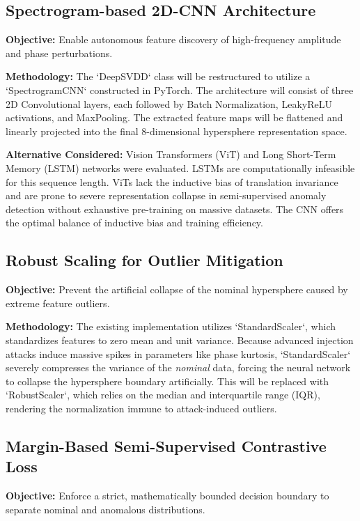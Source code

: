 \documentclass[10pt, conference]{IEEEtran}
\begin{document}
\subsection{Spectrogram-based 2D-CNN Architecture}
\textbf{Objective:} Enable autonomous feature discovery of high-frequency amplitude and phase perturbations.

\textbf{Methodology:} The `DeepSVDD` class will be restructured to utilize a `SpectrogramCNN` constructed in PyTorch. The architecture will consist of three 2D Convolutional layers, each followed by Batch Normalization, LeakyReLU activations, and MaxPooling. The extracted feature maps will be flattened and linearly projected into the final 8-dimensional hypersphere representation space. 

\textbf{Alternative Considered:} Vision Transformers (ViT) and Long Short-Term Memory (LSTM) networks were evaluated. LSTMs are computationally infeasible for this sequence length. ViTs lack the inductive bias of translation invariance and are prone to severe representation collapse in semi-supervised anomaly detection without exhaustive pre-training on massive datasets. The CNN offers the optimal balance of inductive bias and training efficiency.

\subsection{Robust Scaling for Outlier Mitigation}
\textbf{Objective:} Prevent the artificial collapse of the nominal hypersphere caused by extreme feature outliers.

\textbf{Methodology:} The existing implementation utilizes `StandardScaler`, which standardizes features to zero mean and unit variance. Because advanced injection attacks induce massive spikes in parameters like phase kurtosis, `StandardScaler` severely compresses the variance of the \textit{nominal} data, forcing the neural network to collapse the hypersphere boundary artificially. This will be replaced with `RobustScaler`, which relies on the median and interquartile range (IQR), rendering the normalization immune to attack-induced outliers.

\subsection{Margin-Based Semi-Supervised Contrastive Loss}
\textbf{Objective:} Enforce a strict, mathematically bounded decision boundary to separate nominal and anomalous distributions.
\end{document}
